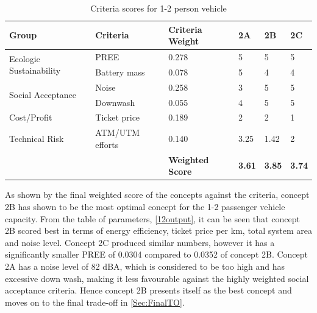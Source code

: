 \begin{table}[h]
\centering
\captionsetup{justification=centering}
\caption{Criteria scores for 1-2 person vehicle}
\label{12criteriascores}
\begin{tabular}{@{}llllll@{}}
\toprule
\textbf{Group}                           & \textbf{Criteria}  & \textbf{Criteria Weight}  & \textbf{2A}   & \textbf{2B}   & \textbf{2C}   \\  \midrule
\multirow{2}{*}{Ecologic Sustainability} & PREE & 0.278                   & 5             & 5             & 5             \\
                                         & Battery mass       & 0.078                   & 5             & 4             & 4             \\\midrule
\multirow{2}{*}{Social Acceptance}       & Noise              & 0.258                   & 3             & 5             & 5             \\
                                         & Downwash           & 0.055                   & 4             & 5             & 5             \\\midrule
Cost/Profit                              & Ticket price       & 0.189                   & 2             & 2             & 1             \\\midrule
Technical Risk                           & ATM/UTM efforts    & 0.140                   & 3.25          & 1.42          & 2             \\  \midrule
\textbf{}                                & \textbf{}          & \textbf{Weighted Score} & \textbf{3.61} & \textbf{3.85} & \textbf{3.74}  \\ \bottomrule
\end{tabular}
\end{table}


As shown by the final weighted score of the concepts against the criteria, concept 2B has shown to be the most optimal concept for the 1-2 passenger vehicle capacity. From the table of parameters, \autoref{12output}, it can be seen that concept 2B scored best in terms of energy efficiency, ticket price per km, total system area and noise level. Concept 2C produced similar numbers, however it has a significantly smaller PREE of 0.0304 compared to 0.0352 of concept 2B. Concept 2A has a noise level of 82 dBA, which is considered to be too high and has excessive down wash, making it less favourable against the highly weighted social acceptance criteria. Hence concept 2B presents itself as the best concept and moves on to the final trade-off in \autoref{Sec:FinalTO}. 



